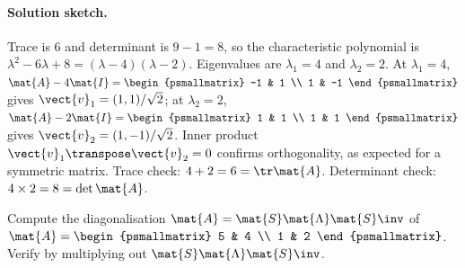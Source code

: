 \paragraph{Solution sketch.}
Trace is $6$ and determinant is $9 - 1 = 8$, so the characteristic
polynomial is $\lambda^{2} - 6\lambda + 8 = (\lambda - 4)(\lambda -
2)$. Eigenvalues are $\lambda_{1} = 4$ and $\lambda_{2} = 2$. At
$\lambda_{1} = 4$, $\mat{A} - 4\mat{I} = \begin{psmallmatrix} -1 & 1
\\ 1 & -1 \end{psmallmatrix}$ gives $\vect{v}_{1} = (1, 1)/\sqrt{2}$;
at $\lambda_{2} = 2$, $\mat{A} - 2\mat{I} = \begin{psmallmatrix} 1 &
1 \\ 1 & 1 \end{psmallmatrix}$ gives $\vect{v}_{2} = (1, -1)/\sqrt{2}$.
Inner product $\vect{v}_{1}\transpose \vect{v}_{2} = 0$ confirms
orthogonality, as expected for a symmetric matrix. Trace check:
$4 + 2 = 6 = \tr \mat{A}$. Determinant check: $4 \times 2 = 8 = \det
\mat{A}$.

\begin{exercise}
Compute the diagonalisation $\mat{A} = \mat{S} \mat{\Lambda}
\mat{S}\inv$ of $\mat{A} =
\begin{psmallmatrix} 5 & 4 \\ 1 & 2 \end{psmallmatrix}$. Verify by
multiplying out $\mat{S} \mat{\Lambda} \mat{S}\inv$.
\end{exercise}

